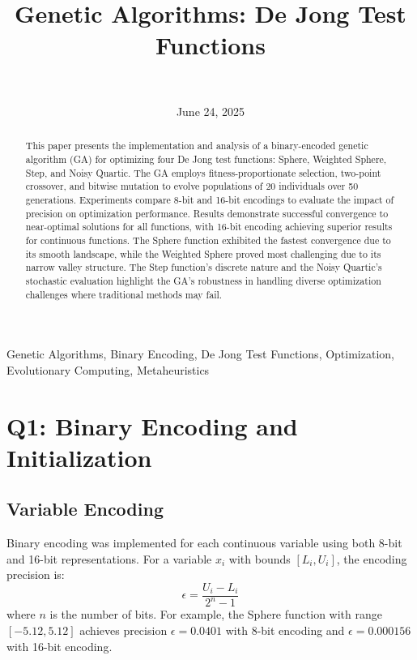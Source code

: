 \documentclass[journal,12pt,onecolumn]{IEEEtran}
\title{Genetic Algorithms: De Jong Test Functions}
\author{
   \IEEEauthorblockN{Matthew D. Branson} \\
   \IEEEauthorblockA{\textit{Department of Computer Science} \\
   \textit{Missouri State University}\\
   Springfield, MO \\
   branson773@live.missouristate.edu
   }
}
\date{June 24, 2025}
\begin{document}
\maketitle

\begin{abstract}
This paper presents the implementation and analysis of a binary-encoded genetic algorithm (GA) for optimizing four De Jong test functions: Sphere, Weighted Sphere, Step, and Noisy Quartic. The GA employs fitness-proportionate selection, two-point crossover, and bitwise mutation to evolve populations of 20 individuals over 50 generations. Experiments compare 8-bit and 16-bit encodings to evaluate the impact of precision on optimization performance. Results demonstrate successful convergence to near-optimal solutions for all functions, with 16-bit encoding achieving superior results for continuous functions. The Sphere function exhibited the fastest convergence due to its smooth landscape, while the Weighted Sphere proved most challenging due to its narrow valley structure. The Step function's discrete nature and the Noisy Quartic's stochastic evaluation highlight the GA's robustness in handling diverse optimization challenges where traditional methods may fail.
\end{abstract}

\begin{IEEEkeywords}
Genetic Algorithms, Binary Encoding, De Jong Test Functions, Optimization, Evolutionary Computing, Metaheuristics
\end{IEEEkeywords}

\section{Q1: Binary Encoding and Initialization}

\subsection{Variable Encoding}
Binary encoding was implemented for each continuous variable using both 8-bit and 16-bit representations. For a variable $x_i$ with bounds $[L_i, U_i]$, the encoding precision is:
\begin{equation}
\epsilon = \frac{U_i - L_i}{2^n - 1}
\end{equation}
where $n$ is the number of bits. For example, the Sphere function with range $[-5.12, 5.12]$ achieves precision $\epsilon = 0.0401$ with 8-bit encoding and $\epsilon = 0.000156$ with 16-bit encoding.
\end{document}
